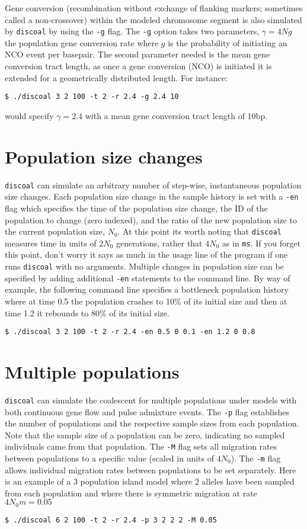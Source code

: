 \documentclass[12pt]{article}
\begin{document}
Gene conversion (recombination without exchange of flanking markers; sometimes called a non-crossover) within the modeled chromosome segment is also simulated by \texttt{discoal} by using the \texttt{-g} flag. The \texttt{-g} option takes two parameters, $\gamma=4Ng$ the population gene conversion rate where $g$ is the probability of initiating an NCO event per basepair. The second parameter needed is the mean gene conversion tract length, as once a gene conversion (NCO) is initiated it is extended for a geometrically distributed length. For instance:
\begin{verbatim}
$ ./discoal 3 2 100 -t 2 -r 2.4 -g 2.4 10
\end{verbatim}
would specify $\gamma=2.4$ with a mean gene conversion tract length of 10bp. 


\section*{Population size changes}
\texttt{discoal} can simulate an arbitrary number of step-wise, instantaneous population size changes. Each population size
change in the sample history is set with a \texttt{-en} flag which specifies the time of the population size change, the ID of the population to change (zero indexed), and the ratio of the new population size to the current population size, $N_0$. At this point its worth noting that \texttt{discoal} measures time in units of $2N_0$ generations, rather that $4N_0$ as in \texttt{ms}. If you forget this point, don't worry it says as much in the usage line of the program if one runs \texttt{discoal} with no arguments. Multiple changes in population size can be specified by adding additional \texttt{-en} statements to the command line. By way of example, the following command line specifies a bottleneck population history where at time 0.5 the population crashes to 10\% of its initial size and then at time 1.2 it rebounds to 80\% of its initial size. 
\begin{verbatim}
$ ./discoal 3 2 100 -t 2 -r 2.4 -en 0.5 0 0.1 -en 1.2 0 0.8
\end{verbatim}

\section*{Multiple populations}
\texttt{discoal} can simulate the coalescent for multiple populations under models with both continuous gene flow and pulse admixture events. The \texttt{-p} flag establishes the number of populations and the respective sample sizes from each population. Note that the sample size of a population can be zero, indicating no sampled individuals came from that population. The \texttt{-M} flag sets all migration rates between populations to a specific value (scaled in units of $4N_0$). The \texttt{-m} flag allows individual migration rates between populations to be set separately. Here is an example of a 3 population island model where 2 alleles have been sampled from each population and where there is symmetric migration at rate $4N_0m = 0.05$
\begin{verbatim}
$ ./discoal 6 2 100 -t 2 -r 2.4 -p 3 2 2 2 -M 0.05
\end{verbatim}
\end{document}
